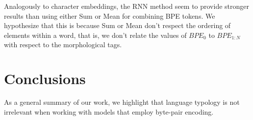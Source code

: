 \documentclass[11pt]{article}
\begin{document}
        Analogously to character embeddings, the RNN method seem to provide stronger results than using either Sum or Mean for combining BPE tokens. We hypothesize that this is because Sum or Mean don't respect the ordering of elements within a word, that is, we don't relate the values of $BPE_0$ to $BPE_{1:N}$ with respect to the morphological tags. 
    
    \section{Conclusions}
    	As a general summary of our work, we highlight that language typology is not irrelevant when working with models that employ byte-pair encoding.     
	
	
	
	
	
	
\end{document}
